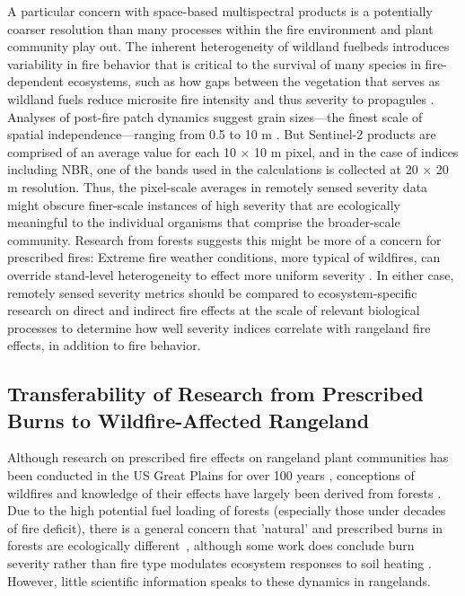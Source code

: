 \documentclass[fire,article,accept,oneauthor,pdftex]{Definitions/mdpi}
\begin{document}
A particular concern with space-based multispectral products is a potentially coarser resolution than many processes within the fire environment and plant community play out. 
The inherent heterogeneity of wildland fuelbeds introduces variability in fire behavior that is critical to the survival of many species in fire-dependent ecosystems, such as how gaps between the vegetation that serves as wildland fuels reduce microsite fire intensity and thus severity to propagules \cite{daibes2018, atchley2021}. 
Analyses of post-fire patch dynamics suggest grain sizes---the finest scale of spatial independence---ranging from 0.5 to 10 m \cite{lamont1993, gimeno-garcia2004, pereira2013, gongalsky2016, moore2021}. 
But Sentinel-2 products are comprised of an average value for each 10 $\times$ 10 m pixel, and in the case of indices including NBR, one of the bands used in the calculations is collected at 20 $\times$ 20 m resolution. 
Thus, the pixel-scale averages in remotely sensed severity data might obscure finer-scale instances of high severity that are ecologically meaningful to the individual organisms that comprise the broader-scale community. 
Research from forests suggests this might be more of a concern for prescribed fires: Extreme fire weather conditions, more typical of wildfires, can override stand-level heterogeneity to effect more uniform severity \cite{romme2006, mcfarland2025}. 
In either case, remotely sensed severity metrics should be compared to ecosystem-specific research on direct and indirect fire effects at the scale of relevant biological processes to determine how well severity indices correlate with rangeland fire effects, in addition to fire behavior. 

\subsection{Transferability of Research from Prescribed Burns to Wildfire-Affected Rangeland}

Although research on prescribed fire effects on rangeland plant communities has been conducted in the US Great Plains for over 100 years \cite{hensel1923, aldous1934, hulbert1969}, conceptions of wildfires and knowledge of their effects have largely been derived from forests \cite{crist2023}.
Due to the high potential fuel loading of forests (especially those under decades of fire deficit), there is a general concern that 'natural' and prescribed burns in forests are ecologically different~\cite{williams1994}, although some work does conclude burn severity rather than fire type modulates ecosystem responses to soil heating \cite{souza-alonso2024}.
However, little scientific information speaks to these dynamics in rangelands. 
\end{document}
